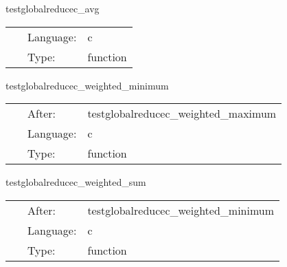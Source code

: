 
\hspace{5mm} testglobalreducec\_avg 

\hspace{5mm}{\it test out gf reduction } 


\hspace{5mm}

 \begin{tabular*}{160mm}{cll} 
~ & Language:  & c \\ 
~ & Type:  & function \\ 
\end{tabular*} 


\vspace{5mm}


\hspace{5mm} testglobalreducec\_weighted\_minimum 

\hspace{5mm}{\it test weighted global minimum reduction } 


\hspace{5mm}

 \begin{tabular*}{160mm}{cll} 
~ & After:  & testglobalreducec\_weighted\_maximum \\ 
~ & Language:  & c \\ 
~ & Type:  & function \\ 
\end{tabular*} 


\vspace{5mm}


\hspace{5mm} testglobalreducec\_weighted\_sum 

\hspace{5mm}{\it test weighted global sum reduction } 


\hspace{5mm}

 \begin{tabular*}{160mm}{cll} 
~ & After:  & testglobalreducec\_weighted\_minimum \\ 
~ & Language:  & c \\ 
~ & Type:  & function \\ 
\end{tabular*} 


\vspace{5mm}

